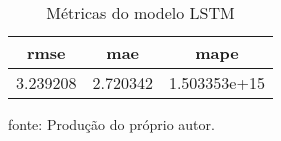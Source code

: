 \begin{table}
\centering
\caption{Métricas do modelo LSTM}
\label{tab:lstm_metrics}
\begin{tabular}{ccc}
\toprule
    rmse &      mae &         mape \\
\midrule
3.239208 & 2.720342 & 1.503353e+15 \\
\bottomrule
\end{tabular}
\par
{\small fonte: Produção do próprio autor.}
\end{table}
